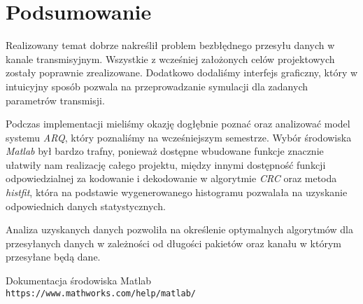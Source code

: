 \documentclass{article}
\begin{document}
\section{Podsumowanie}

Realizowany temat dobrze nakreślił problem bezbłędnego przesyłu danych w kanale transmisyjnym. Wszystkie z wcześniej założonych celów projektowych zostały poprawnie zrealizowane. Dodatkowo dodaliśmy interfejs graficzny, który w intuicyjny sposób pozwala na przeprowadzanie symulacji dla zadanych parametrów transmisji.

Podczas implementacji mieliśmy okazję dogłębnie poznać oraz analizować model systemu \textit{ARQ}, który poznaliśmy na wcześniejszym semestrze. Wybór środowiska \textit{Matlab} był bardzo trafny, ponieważ dostępne wbudowane funkcje znacznie ułatwiły nam realizację całego projektu, między innymi dostępność funkcji odpowiedzialnej za kodowanie i dekodowanie w algorytmie \textit{CRC} oraz metoda \textit{histfit}, która na podstawie wygenerowanego histogramu pozwalała na uzyskanie odpowiednich danych statystycznych. 

Analiza uzyskanych danych pozwoliła na określenie optymalnych algorytmów dla przesyłanych danych w zależności od długości pakietów oraz kanału w którym przesyłane będą dane.

\newpage

\begin{thebibliography}{9}

Dokumentacja środowiska Matlab
\\\texttt{https://www.mathworks.com/help/matlab/}

\end{thebibliography}
\end{document}
